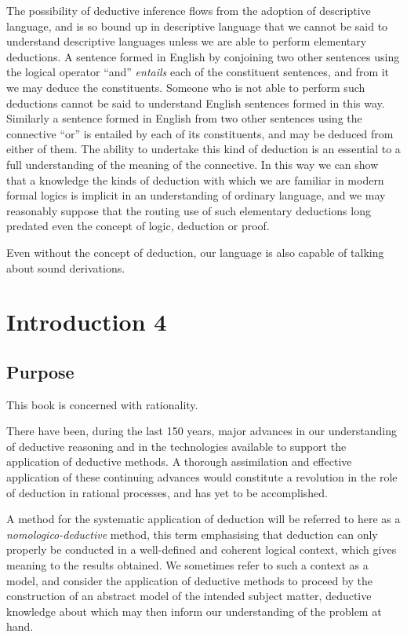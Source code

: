 The possibility of deductive inference flows from the adoption of descriptive language, and is so bound up in descriptive language that we cannot be said to understand descriptive languages unless we are able to perform elementary deductions.
A sentence formed in English by conjoining two other sentences using the logical operator ``and'' {\it entails} each of the constituent sentences, and from it we may deduce the constituents.
Someone who is not able to perform such deductions cannot be said to understand English sentences formed in this way.
Similarly a sentence formed in English from two other sentences using the connective ``or'' is entailed by each of its constituents, and may be deduced from either of them.
The ability to undertake this kind of deduction is an essential to a full understanding of the meaning of the connective.
In this way we can show that a knowledge the kinds of deduction with which we are familiar in modern formal logics is implicit in an understanding of ordinary language, and we may reasonably suppose that the routing use of such elementary deductions long predated even the concept of logic, deduction or proof.

Even without the concept of deduction, our language is also capable of talking about sound derivations.


\chapter{Introduction 4}

\section{Purpose}

This book is concerned with rationality.

There have been, during the last 150 years, major advances in our understanding of deductive reasoning and in the technologies available to support the application of deductive methods.
A thorough assimilation and effective application of these continuing advances would constitute a revolution in the role of deduction in rational processes, and has yet to be accomplished.

A method for the systematic application of deduction will be referred to here as a \emph{nomologico-deductive} method, this term emphasising that deduction can only properly be conducted in a well-defined and coherent logical context, which gives meaning to the results obtained.
We sometimes refer to such a context as a model, and consider the application of deductive methods to proceed by the construction of an abstract model of the intended subject matter, deductive knowledge about which may then inform our understanding of the problem at hand.

